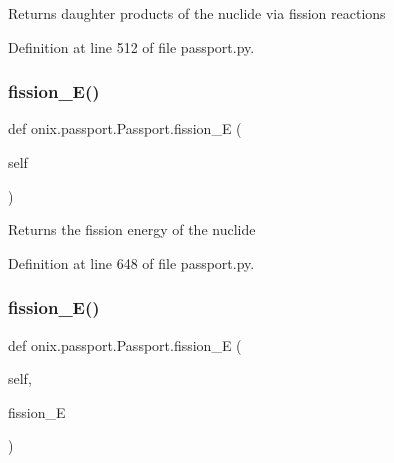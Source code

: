 \begin{DoxyVerb}Returns daughter products of the nuclide via fission reactions\end{DoxyVerb}
 

Definition at line 512 of file passport.\+py.

\mbox{\label{classonix_1_1passport_1_1Passport_ac52e38d981da6f201f37e4a747dd37d2}} 
\subsubsection{\texorpdfstring{fission\+\_\+\+E()}{fission\_E()}\hspace{0.1cm}{\footnotesize\ttfamily [1/2]}}
{\footnotesize\ttfamily def onix.\+passport.\+Passport.\+fission\+\_\+E (\begin{DoxyParamCaption}\item[{}]{self }\end{DoxyParamCaption})}

\begin{DoxyVerb}Returns the fission energy of the nuclide\end{DoxyVerb}
 

Definition at line 648 of file passport.\+py.

\mbox{\label{classonix_1_1passport_1_1Passport_aae7f9097507c87f2f098940416d738e7}} 
\subsubsection{\texorpdfstring{fission\+\_\+\+E()}{fission\_E()}\hspace{0.1cm}{\footnotesize\ttfamily [2/2]}}
{\footnotesize\ttfamily def onix.\+passport.\+Passport.\+fission\+\_\+E (\begin{DoxyParamCaption}\item[{}]{self,  }\item[{}]{fission\+\_\+E }\end{DoxyParamCaption})}

